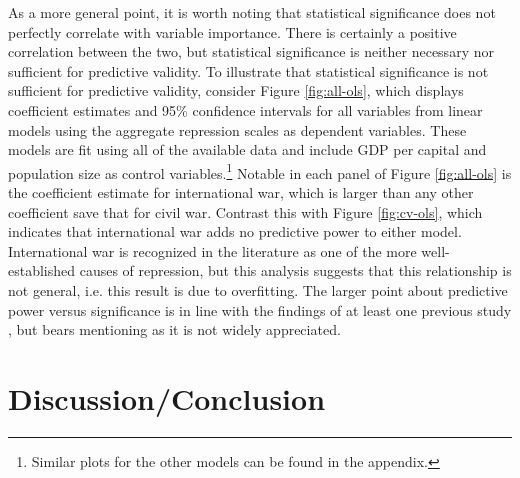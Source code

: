 \documentclass[11pt]{article}
\begin{document}
As a more general point, it is worth noting that statistical significance does not perfectly correlate with variable importance. There is certainly a positive correlation between the two, but statistical significance is neither necessary nor sufficient for predictive validity. To illustrate that statistical significance is not sufficient for predictive validity, consider Figure \ref{fig:all-ols}, which displays coefficient estimates and 95\% confidence intervals for all variables from linear models using the aggregate repression scales as dependent variables. These models are fit using all of the available data and include GDP per capital and population size as control variables.\footnote{Similar plots for the other models can be found in the appendix.}  Notable in each panel of Figure \ref{fig:all-ols} is the coefficient estimate for international war, which is larger than any other coefficient save that for civil war. Contrast this with Figure \ref{fig:cv-ols}, which indicates that international war adds no predictive power to either model. International war is recognized in the literature as one of the more well-established causes of repression, but this analysis suggests that this relationship is not general, i.e. this result is due to overfitting. The larger point about predictive power versus significance is in line with the findings of at least one previous study \citep{Wardetal2010}, but bears mentioning as it is not widely appreciated.

\section{Discussion/Conclusion}
\end{document}

